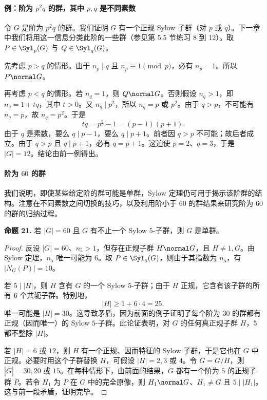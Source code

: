 \paragraph{例：阶为 $p^2q$ 的群，其中 $p,q$ 是不同素数}
令 $G$ 是阶为 $p^2q$ 的群。我们证明 $G$ 有一个正规 Sylow 子群（对 $p$ 或 $q$）。下一章中我们将用这一信息分类此阶的一些群（参见第 5.5 节练习 8 到 12）。取 $P\in\Syl_p(G)$ 与 $Q\in\Syl_q(G)$。

先考虑 $p>q$ 的情形。由于 $n_p\mid q$ 且 $n_p\equiv1\pmod p$，必有 $n_p=1$。所以 $P\normal G$。

再考虑 $p<q$ 的情形。若 $n_q=1$，则 $Q\normal G$。否则假设 $n_q>1$，即 $n_q=1+tq$，其中 $t>0$。又 $n_q\mid p^2$，所以 $n_q=p$ 或 $p^2$。由于 $q>p$，不可能有 $n_q=p$，故 $n_q=p^2$。于是
\[
  tq=p^2-1=(p-1)(p+1).
\]
由于 $q$ 是素数，要么 $q\mid p-1$，要么 $q\mid p+1$。前者因 $q>p$ 不可能；故后者成立。由于 $q>p$ 且 $q\mid p+1$，必有 $q=p+1$。这迫使 $p=2$、$q=3$，于是 $|G|=12$。结论由前一例得出。

\paragraph{阶为 $60$ 的群}
我们说明，即使某些给定阶的群可能是单群，Sylow 定理仍可用于揭示该阶群的结构。注意在不同素数之间切换的技巧，以及利用阶小于 $60$ 的群结果来研究阶为 $60$ 的群的归纳过程。

\medskip
\noindent\textbf{命题 21.} 若 $|G|=60$ 且 $G$ 有不止一个 Sylow $5$-子群，则 $G$ 是单群。

\begin{proof}
反设 $|G|=60$、$n_5>1$，但存在正规子群 $H\normal G$，且 $H\neq1,G$。由 Sylow 定理，$n_5$ 唯一可能为 $6$。取 $P\in\Syl_5(G)$，则由于其指数为 $n_5$，有 $|N_G(P)|=10$。

若 $5\mid |H|$，则 $H$ 含有 $G$ 的一个 Sylow $5$-子群；由于 $H$ 正规，它含有该子群的所有 $6$ 个共轭子群。特别地，
\[
  |H|\geq1+6\cdot4=25,
\]
唯一可能是 $|H|=30$。这导致矛盾，因为前面的例子证明了每个阶为 $30$ 的群都有正规（因而唯一）的 Sylow $5$-子群。此论证表明，对 $G$ 的任何真正规子群 $H$，$5$ 都不整除 $|H|$。

若 $|H|=6$ 或 $12$，则 $H$ 有一个正规、因而特征的 Sylow 子群，于是它也在 $G$ 中正规。必要时用这个子群替换 $H$，可假设 $|H|=2,3$ 或 $4$。令 $\overline G=G/H$，则 $|\overline G|=30,20$ 或 $15$。在每种情形下，由前面的结果，$\overline G$ 都有一个阶为 $5$ 的正规子群 $\overline P$。若令 $H_1$ 为 $\overline P$ 在 $G$ 中的完全原像，则 $H_1\normal G$、$H_1\neq G$ 且 $5\mid |H_1|$。这与前一段矛盾，证明完毕。
\end{proof}

